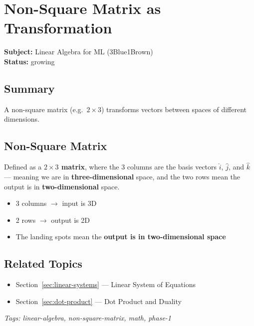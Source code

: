 \section{Non-Square Matrix as Transformation}
\label{sec:non-square}

\noindent\textbf{Subject:} Linear Algebra for ML (3Blue1Brown) \\
\textbf{Status:} growing

\subsection*{Summary}
A non-square matrix (e.g.\ $2\times3$) transforms vectors between spaces of different dimensions.

\subsection{Non-Square Matrix}

Defined as a \textbf{$2\times3$ matrix}, where the 3 columns are the basis vectors $\hat{i}$, $\hat{j}$, and $\hat{k}$ --- meaning we are in \textbf{three-dimensional} space, and the two rows mean the output is in \textbf{two-dimensional} space.

\begin{itemize}[nosep]
  \item 3 columns $\rightarrow$ input is 3D
  \item 2 rows $\rightarrow$ output is 2D
  \item The landing spots mean the \textbf{output is in two-dimensional space}
\end{itemize}

\subsection*{Related Topics}
\begin{itemize}[nosep]
  \item Section~\ref{sec:linear-systems} --- Linear System of Equations
  \item Section~\ref{sec:dot-product} --- Dot Product and Duality
\end{itemize}

\bigskip
\noindent\textit{Tags: linear-algebra, non-square-matrix, math, phase-1}
